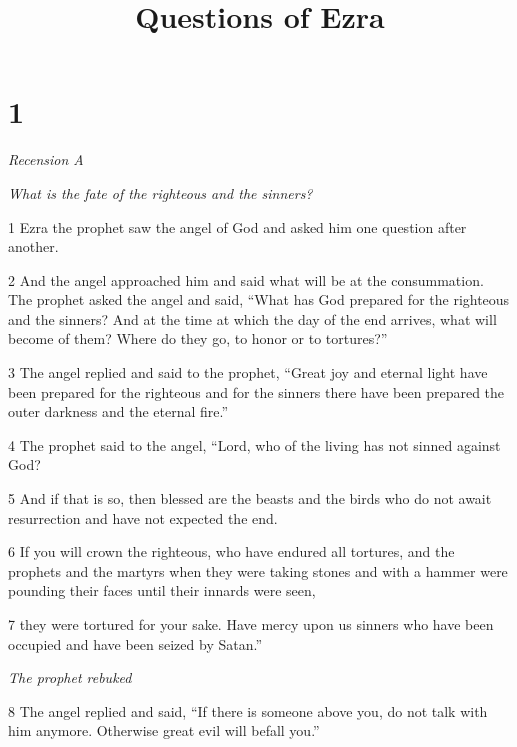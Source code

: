 

\title{Questions of Ezra}

\chapter{1}

\par \textit{Recension A}

\par \textit{What is the fate of the righteous and the sinners?}

\par 1 Ezra the prophet saw the angel of God and asked him one question after another.

\par 2 And the angel approached him and said what will be at the consummation. The prophet asked the angel and said, “What has God prepared for the righteous and the sinners? And at the time at which the day of the end arrives, what will become of them? Where do they go, to honor or to tortures?”

\par 3 The angel replied and said to the prophet, “Great joy and eternal light have been prepared for the righteous and for the sinners there have been prepared the outer darkness and the eternal fire.”

\par 4 The prophet said to the angel, “Lord, who of the living has not sinned against God?

\par 5 And if that is so, then blessed are the beasts and the birds who do not await resurrection and have not expected the end.

\par 6 If you will crown the righteous, who have endured all tortures, and the prophets and the martyrs when they were taking stones and with a hammer were pounding their faces until their innards were seen,

\par 7 they were tortured for your sake. Have mercy upon us sinners who have been occupied and have been seized by Satan.”

\par \textit{The prophet rebuked}

\par 8 The angel replied and said, “If there is someone above you, do not talk with him anymore. Otherwise great evil will befall you.”

